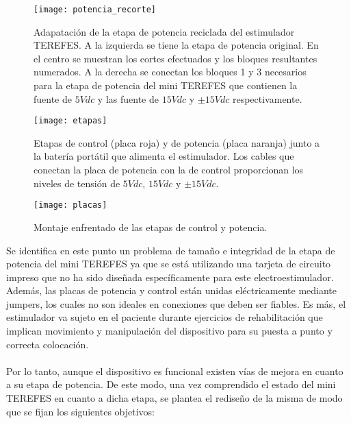 \begin{figure}[!htb]
\centering
\texttt{[image: potencia\_recorte]}
  \caption{Adapatación de la etapa de potencia reciclada del estimulador TEREFES. A la izquierda se tiene la etapa de potencia original. En el centro se muestran los cortes efectuados y los bloques resultantes numerados. A la derecha se conectan los bloques 1 y 3 necesarios para la etapa de potencia del mini TEREFES que contienen la fuente de $5Vdc$ y las fuente de $15Vdc$ y $\pm15Vdc$ respectivamente.}\label{fig:potencia_recorte}
\end{figure}

\begin{figure}[!htb]
  \texttt{[image: etapas]}
  \caption{Etapas de control (placa roja) y de potencia (placa naranja) junto a la batería portátil que alimenta el estimulador. Los cables que conectan la placa de potencia con la de control proporcionan los niveles de tensión de $5Vdc$, $15Vdc$ y $\pm15Vdc$.}\label{fig:etapas}
\endminipage\hfill
{}
  \texttt{[image: placas]}
  \caption{Montaje enfrentado de las etapas de control y potencia.}\label{fig:placas}
\endminipage\hfill
\end{figure}

Se identifica en este punto un problema de tamaño e integridad de la etapa de potencia del mini TEREFES ya que se está utilizando una tarjeta de circuito impreso que no ha sido diseñada específicamente para este electroestimulador. Además, las placas de potencia y control están unidas eléctricamente mediante jumpers, los cuales no son ideales en conexiones que deben ser fiables. Es más, el estimulador va sujeto en el paciente durante ejercicios de rehabilitación que implican movimiento y manipulación del dispositivo para su puesta a punto y correcta colocación. 
\\
\\
Por lo tanto, aunque el dispositivo es funcional existen vías de mejora en cuanto a su etapa de potencia. De este modo, una vez comprendido el estado del mini TEREFES en cuanto a dicha etapa, se plantea el rediseño de la misma de modo que se fijan los siguientes objetivos:


